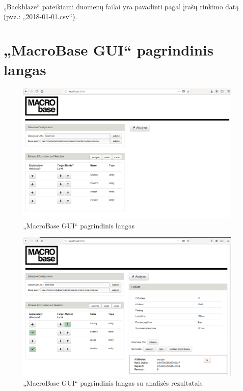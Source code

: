 \documentclass{VUMIFPSkursinis}
\begin{document}
„Backblaze“ pateikiami duomenų failai yra pavadinti pagal įrašų rinkimo datą (pvz.: „2018-01-01.csv“).

\section{„MacroBase GUI“ pagrindinis langas} \label{sec:gui}
\begin{figure}[H]
    \centering
    \includegraphics[scale=0.33]{img/gui}
    \caption{„MacroBase GUI“ pagrindinis langas}
    \label{img:gui}
\end{figure}
\begin{figure}[H]
    \centering
    \includegraphics[scale=0.33]{img/gui2}
    \caption{„MacroBase GUI“ pagrindinis langas su analizės rezultatais}
    \label{img:gui2}
\end{figure}
\end{document}
